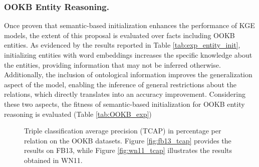 \subsubsection{OOKB Entity Reasoning.}
Once proven that semantic-based initialization enhances the performance of KGE models, the extent of this proposal is evaluated over facts including OOKB entities. As evidenced by the results reported in Table \ref{tab:exp_entity_init}, initializing entities with word embeddings increases the specific knowledge about the entities, providing information that may not be inferred otherwise. Additionally, the inclusion of ontological information improves the generalization aspect of the model, enabling the inference of general restrictions about the relations, which directly translates into an accuracy improvement. Considering these two aspects, the fitness of semantic-based initialization for OOKB entity reasoning is evaluated (Table \ref{tab:OOKB_exp})

\begin{figure}[t!]
    \centering
    \caption{Triple classification average precision (TCAP) in percentage per relation on the OOKB datasets. Figure \ref{fig:fb13_tcap} provides the results on FB13, while Figure \ref{fig:wn11_tcap} illustrates the results obtained in WN11.}
    \label{fig:tcap_OOKB}
\end{figure}

